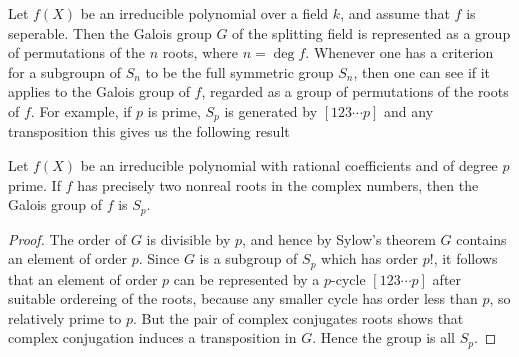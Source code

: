 \begin{example}[]
    Let $f(X)$ be an irreducible polynomial over a field $k$, and assume that $f$ is seperable. Then the Galois group $G$ of the splitting field is represented as a group of permutations of the $n$ roots, where $n=\deg f$.
    Whenever one has a criterion for a subgroupn of $S_n$ to be the full symmetric group $S_n$, then one can see if it applies to the Galois group of $f$, regarded as a group of permutations of the roots of $f$. 
    For example, if $p$ is prime, $S_p$ is generated by $[123\cdots p]$ and any transposition this gives us the following result

\begin{theorem}
Let $f(X)$ be an irreducible polynomial with rational coefficients and of degree $p$ prime. If $f$ has precisely two nonreal roots in the complex numbers, then the Galois group of $f$ is $S_p$.
\end{theorem}
\begin{proof}
    The order of $G$ is divisible by $p$, and hence by Sylow's theorem $G$ contains an element of order $p$. Since $G$ is a subgroup of $S_p$ which has order $p$!, it follows that an element of order  $p$ can be represented by a $p$-cycle $[123\cdots p]$ after suitable ordereing of the roots, because any smaller cycle has order less than $p$, so relatively prime to $p$.
    But the pair of complex conjugates roots shows that complex conjugation induces a transposition in $G$. Hence the group is all $S_p$.
\end{proof}
\end{example}
